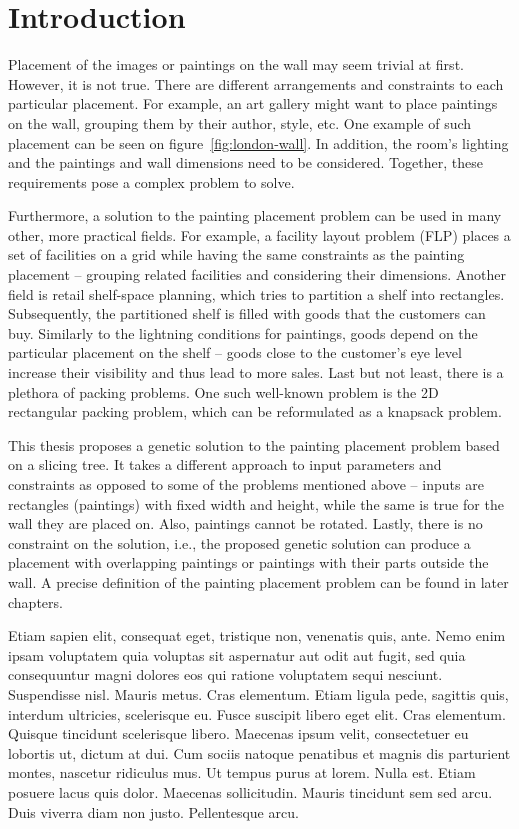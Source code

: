 \chapter{Introduction}\label{ch:introduction}

Placement of the images or paintings on the wall may seem trivial at first.
However, it is not true.
There are different arrangements and constraints to each particular placement.
For example, an art gallery might want to place paintings on the wall, grouping them by their author, style, etc.
One example of such placement can be seen on figure~\ref{fig:london-wall}.
In addition, the room's lighting and the paintings and wall dimensions need to be considered.
Together, these requirements pose a complex problem to solve.

Furthermore, a solution to the painting placement problem can be used in many other, more practical fields.
For example, a facility layout problem (FLP) places a set of facilities on a grid
while having the same constraints as the painting placement – grouping related facilities and considering their dimensions.
Another field is retail shelf-space planning, which tries to partition a shelf into rectangles.
Subsequently, the partitioned shelf is filled with goods that the customers can buy.
Similarly to the lightning conditions for paintings, goods depend on the
particular placement on the shelf – goods close to the customer's eye level increase their visibility and thus lead to more sales.
Last but not least, there is a plethora of packing problems.
One such well-known problem is the 2D rectangular packing problem, which can be reformulated as a knapsack problem.

This thesis proposes a genetic solution to the painting placement problem based on a slicing tree.
It takes a different approach to input parameters and constraints as opposed to some of the
problems mentioned above – inputs are rectangles (paintings) with fixed width and height,
while the same is true for the wall they are placed on. Also, paintings cannot be rotated.
Lastly, there is no constraint on the solution, i.e., the proposed genetic solution can
produce a placement with overlapping paintings or paintings with their parts outside the wall.
A precise definition of the painting placement problem can be found in later chapters.

 Etiam sapien elit, consequat eget, tristique non, venenatis quis, ante. Nemo enim ipsam voluptatem quia voluptas sit aspernatur aut odit aut fugit, sed quia consequuntur magni dolores eos qui ratione voluptatem sequi nesciunt. Suspendisse nisl. Mauris metus. Cras elementum. Etiam ligula pede, sagittis quis, interdum ultricies, scelerisque eu. Fusce suscipit libero eget elit. Cras elementum. Quisque tincidunt scelerisque libero. Maecenas ipsum velit, consectetuer eu lobortis ut, dictum at dui. Cum sociis natoque penatibus et magnis dis parturient montes, nascetur ridiculus mus. Ut tempus purus at lorem. Nulla est. Etiam posuere lacus quis dolor. Maecenas sollicitudin. Mauris tincidunt sem sed arcu. Duis viverra diam non justo. Pellentesque arcu.


